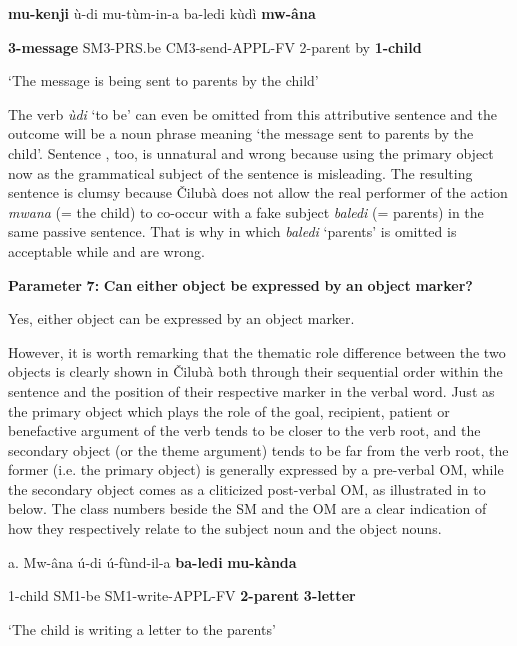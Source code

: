 \documentclass[output=paper]{langscibook}
\begin{document}
    \textbf{mu-kenji}    ù-di      mu-tùm-in-a        ba-ledi    kùdì  \textbf{mw-âna}

\textbf{3-message}  SM3-PRS.be  CM3-send-APPL-FV    2-parent    by   \textbf{1-child}

\glt ‘The message is being sent to parents by the child’

The verb \textit{ùdi} ‘to be’ can even be omitted from this attributive sentence and the outcome will be a noun phrase meaning ‘the message sent to parents by the child’. Sentence , too, is unnatural and wrong because using the primary object now as the grammatical subject of the sentence is misleading. The resulting sentence is clumsy because Čilubà does not allow the real performer of the action \textit{mwana} (= the child) to co-occur with a fake subject \textit{baledi} (= parents) in the same passive sentence. That is why  in which \textit{baledi} ‘parents’ is omitted is acceptable while  and  are wrong.

\textbf{Parameter} \textbf{7:} \textbf{Can} \textbf{either} \textbf{object} \textbf{be} \textbf{expressed} \textbf{by} \textbf{an} \textbf{object} \textbf{marker?}

Yes, either object can be expressed by an object marker.

However, it is worth remarking that the thematic role difference between the two objects is clearly shown in Čilubà both through their sequential order within the sentence and the position of their respective marker in the verbal word. Just as the primary object which plays the role of the goal, recipient, patient or benefactive argument of the verb tends to be closer to the verb root, and the secondary object (or the theme argument) tends to be far from the verb root, the former (i.e. the primary object) is generally expressed by a pre-verbal OM, while the secondary object comes as a cliticized post-verbal OM, as illustrated in  to  below. The class numbers beside the SM and the OM are a clear indication of how they respectively relate to the subject noun and the object nouns.

\ea%
    \label{ex:lukusa:55}
    \z

          a.  Mw-âna    ú-di      ú-fùnd-il-a          \textbf{ba-ledi}    \textbf{mu-kànda}

      1-child    SM1-be    SM1-write-APPL-FV    \textbf{2-parent}  \textbf{3-letter}

\glt ‘The child is writing a letter to the parents’
\end{document}
